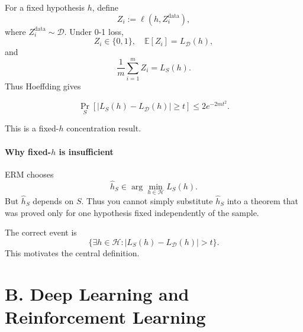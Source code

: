 \documentclass[11pt,a4paper]{article}
\theoremstyle{definition}
\begin{document}
For a fixed hypothesis $h$, define
\[
Z_i := \ell(h, Z_i^{\text{data}}),
\]
where $Z_i^{\text{data}} \sim \mathcal{D}$. Under 0-1 loss,
\[
Z_i \in \{0, 1\}, \quad \mathbb{E}[Z_i] = L_{\mathcal{D}}(h),
\]
and
\[
\frac{1}{m} \sum_{i=1}^m Z_i = L_S(h).
\]
Thus Hoeffding gives

\begin{equation*}
\boxed{\Pr_{S} [|L_{S}(h) - L_{\mathcal{D}}(h)| \geq t] \leq 2e^{-2mt^{2}}.}
\end{equation*}

This is a fixed-$h$ concentration result.

\paragraph{Why fixed-$h$ is insufficient}

ERM chooses
\[
\widehat{h}_S \in \arg \min_{h \in \mathcal{H}} L_S(h).
\]
But $\widehat{h}_S$ depends on $S$. Thus you cannot simply substitute $\widehat{h}_S$ into a theorem that was proved only for one hypothesis fixed independently of the sample.

The correct event is
\[
\{\exists h \in \mathcal{H} : |L_S(h) - L_{\mathcal{D}}(h)| > t\}.
\]
This motivates the central definition.



\section{B. Deep Learning and Reinforcement Learning}
\end{document}
